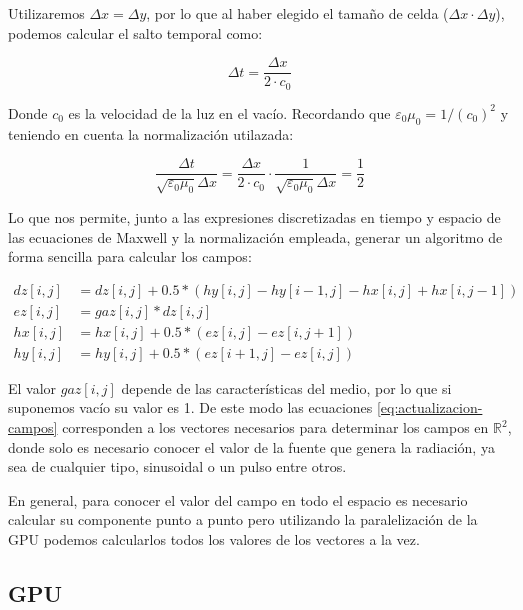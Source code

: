 \documentclass[11pt,a4paper,twoside,pdf]{article}
\numberwithin{equation}{section}
\begin{document}
Utilizaremos $\Delta x = \Delta y$, por lo que al haber elegido el tamaño de celda ($\Delta x \cdot \Delta y$), podemos calcular el salto temporal como:

\begin{equation}
\Delta t=\frac{\Delta x}{2 \cdot c_{0}}
\end{equation}

Donde $c_{0}$ es la velocidad de la luz en el vacío. Recordando que $\varepsilon_{0} \mu_{0}=1/(c_{0})^2$ y teniendo en cuenta la normalización utilazada:

\begin{equation}
    \frac{\Delta t}{\sqrt{\varepsilon_{0} \mu_{0}} \Delta x}=\frac{\Delta x}{2 \cdot c_{0}}\cdot 
     \frac{1}{\sqrt{\varepsilon_{0} \mu_{0}} \Delta x}=\frac{1}{2}
\end{equation}

Lo que nos permite, junto a las expresiones discretizadas en tiempo y espacio de las ecuaciones de Maxwell y la normalización empleada, generar un algoritmo de forma sencilla para calcular los campos:

\begin{align} \label{eq:actualizacion-campos}
    dz[i,j]&=dz[i,j] + 0.5*(hy[i,j]-hy[i-1,j]-hx[i,j]+hx[i,j-1]) \nonumber \\
    ez[i,j]&=gaz[i,j]*dz[i,j] \nonumber \\
    hx[i,j]&=hx[i,j]+0.5*(ez[i,j]-ez[i,j+1]) \nonumber \\
    hy[i,j]&=hy[i,j]+0.5*(ez[i+1,j]-ez[i,j])
\end{align}

El valor $gaz[i,j]$ depende de las características del medio, por lo que si suponemos vacío su valor es 1. De este modo las ecuaciones \eqref{eq:actualizacion-campos} corresponden a los vectores necesarios para determinar los campos en $\mathbb R^{2}$, donde solo es necesario conocer el valor de la fuente que genera la radiación, ya sea de cualquier tipo, sinusoidal o un pulso entre otros.  

En general, para conocer el valor del campo en todo el espacio es necesario calcular  su componente punto a punto pero utilizando la paralelización de la GPU podemos calcularlos todos los valores de los vectores a la vez.



\subsection{GPU} \label{subsection:GPU}
\end{document}
